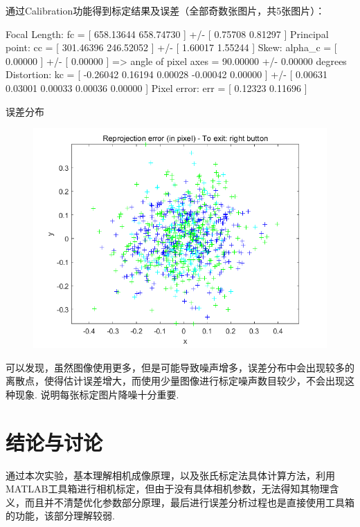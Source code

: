 \documentclass[12pt, a4paper, oneside]{ctexart}
\numberwithin{equation}{section}  %
\begin{document}
通过Calibration功能得到标定结果及误差（全部奇数张图片，共5张图片）：
\begin{matlabcode}
Focal Length: fc = [ 658.13644   658.74730 ] +/- [ 0.75708   0.81297 ]
Principal point: cc = [ 301.46396   246.52052 ] +/- [ 1.60017   1.55244 ]
Skew: alpha_c = [ 0.00000 ] +/- [ 0.00000  ]   => angle of pixel axes = 90.00000 +/- 0.00000 degrees
Distortion: kc = [ -0.26042   0.16194   0.00028   -0.00042  0.00000 ] +/- [ 0.00631   0.03001   0.00033   0.00036  0.00000 ]
Pixel error: err = [ 0.12323   0.11696 ]
\end{matlabcode}
误差分布
\begin{figure}[htbp]
    \centering
    \includegraphics[scale=0.6]{error1.png}
\end{figure}

可以发现，虽然图像使用更多，但是可能导致噪声增多，误差分布中会出现较多的离散点，使得估计误差增大，而使用少量图像进行标定噪声数目较少，不会出现这种现象. 说明每张标定图片降噪十分重要.


\section{结论与讨论}
通过本次实验，基本理解相机成像原理，以及张氏标定法具体计算方法，利用MATLAB工具箱进行相机标定，但由于没有具体相机参数，无法得知其物理含义，而且并不清楚优化参数部分原理，最后进行误差分析过程也是直接使用工具箱的功能，该部分理解较弱.
\end{document}
